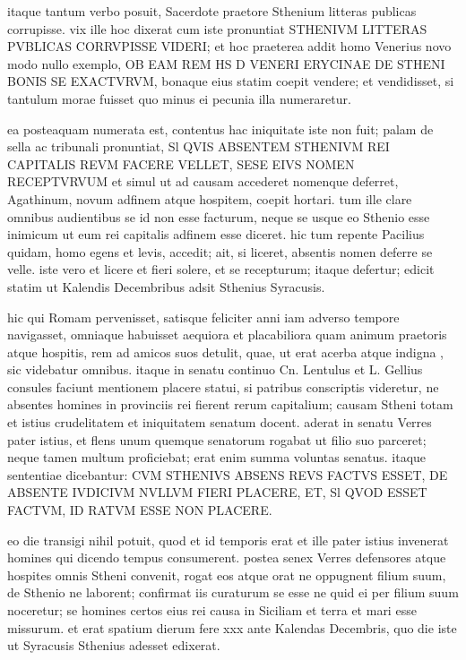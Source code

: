  itaque tantum verbo posuit, Sacerdote praetore Sthenium litteras publicas corrupisse. vix ille hoc dixerat cum iste pronuntiat STHENIVM LITTERAS PVBLICAS CORRVPISSE VIDERI; et hoc praeterea addit homo Venerius novo modo nullo exemplo, OB EAM REM HS D VENERI ERYCINAE DE STHENI BONIS SE EXACTVRVM, bonaque eius statim coepit vendere; et vendidisset, si tantulum morae fuisset quo minus ei pecunia illa numeraretur.

 ea posteaquam numerata est, contentus hac iniquitate iste non fuit; palam de sella ac tribunali pronuntiat, Sl QVIS ABSENTEM STHENIVM REI CAPITALIS REVM FACERE VELLET, SESE EIVS NOMEN RECEPTVRVUM et simul ut ad causam accederet nomenque deferret, Agathinum, novum adfinem atque hospitem, coepit hortari. tum ille clare omnibus audientibus se id non esse facturum, neque se usque eo Sthenio esse inimicum ut eum rei capitalis adfinem esse diceret. hic tum repente Pacilius quidam, homo egens et levis, accedit; ait, si liceret, absentis nomen deferre se velle. iste vero et licere et fieri solere, et se recepturum; itaque defertur; edicit statim ut Kalendis Decembribus adsit Sthenius Syracusis.

 hic qui Romam pervenisset, satisque feliciter anni iam adverso tempore navigasset, omniaque habuisset aequiora et placabiliora quam animum praetoris atque hospitis, rem ad amicos suos detulit, quae, ut erat acerba atque indigna , sic videbatur omnibus. itaque in senatu continuo Cn. Lentulus et L. Gellius consules faciunt mentionem placere statui, si patribus conscriptis videretur, ne absentes homines in provinciis rei fierent rerum capitalium; causam Stheni totam et istius crudelitatem et iniquitatem senatum docent. aderat in senatu Verres pater istius, et flens unum quemque senatorum rogabat ut filio suo parceret; neque tamen multum proficiebat; erat enim summa voluntas senatus. itaque sententiae dicebantur: CVM STHENIVS ABSENS REVS FACTVS ESSET, DE ABSENTE IVDICIVM NVLLVM FIERI PLACERE, ET, Sl QVOD ESSET FACTVM, ID RATVM ESSE NON PLACERE.

 eo die transigi nihil potuit, quod et id temporis erat et ille pater istius invenerat homines qui dicendo tempus consumerent. postea senex Verres defensores atque hospites omnis Stheni convenit, rogat eos atque orat ne oppugnent filium suum, de Sthenio ne laborent; confirmat iis curaturum se esse ne quid ei per filium suum noceretur; se homines certos eius rei causa in Siciliam et terra et mari esse missurum. et erat spatium dierum fere xxx ante Kalendas Decembris, quo die iste ut Syracusis Sthenius adesset edixerat.

